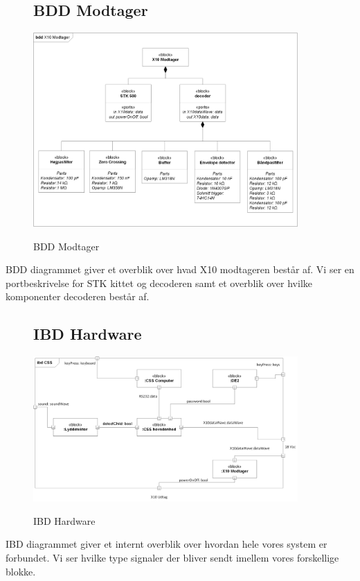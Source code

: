 \begin{figure}[!htbp] \centering
\subsection{BDD Modtager}
{\includegraphics[width=0.9\textwidth]{billeder/diagrammer/BDD_Modtager}}
\caption{BDD Modtager}
\label{lab:bddmodtager}
\raggedright
\end{figure}
BDD diagrammet giver et overblik over hvad X10 modtageren består af. Vi ser en portbeskrivelse for STK kittet og decoderen samt et overblik over hvilke komponenter decoderen består af.

\begin{figure}[!htbp] \centering
\subsection{IBD Hardware}
{\includegraphics[width=0.9\textwidth]{billeder/diagrammer/IBD_Hardware}}
\caption{IBD Hardware}
\label{lab:ibdhardware}
\raggedright
\end{figure}
IBD diagrammet giver et internt overblik over hvordan hele vores system er forbundet. Vi ser hvilke type signaler der bliver sendt imellem vores forskellige blokke.

